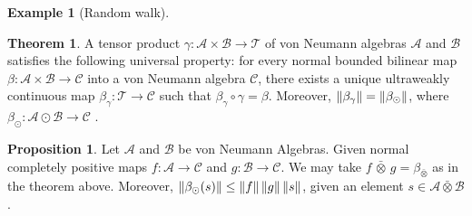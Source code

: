 \documentclass[10pt,a4paper]{amsart}
\theoremstyle{definition}
\theoremstyle{definition}
\newtheorem{example}[definition]{Example}
\theoremstyle{definition}
\newtheorem{lemma}[definition]{Lemma}
\theoremstyle{definition}
\newtheorem{proposition}[definition]{Proposition}
\theoremstyle{definition}
\theoremstyle{definition}
\newtheorem{theorem}[definition]{Theorem}
\begin{document}
\begin{example}[Random walk]
\begin{comment}
\begin{proposition} \cite[Proposition 3.2.2]{effrosOperatorSpaces2000} \label{prop:cb_dual}
  Given $C^*$-algebras $\mathcal{A}$ and $\mathcal{B}$, and a completely bounded mapping $\phi : A \to B$, we have
\[
\|\phi^*\|_{\text{cb}} =  \|\phi\|_{\text{cb}}.
\]
\end{proposition}



\begin{lemma} \cite[p.19]{pisierIntroductionOperatorSpace2003} \label{lem:cb_comp_submult}
  Given completely bounded maps $\phi: B (\mathcal{H}) \to B (\mathcal{K}) $ and $\psi: B (\mathcal{K}) \to B (\mathcal{L})$, it holds that
  $$ \cbnorm{\psi \cdot \phi} \leq \cbnorm{\psi} \cdot \cbnorm{\phi}  $$
\end{lemma}

\begin{proposition} \label{prop:dirsum_cb} \cite[Exercise 2.1.3.]{pisierIntroductionOperatorSpace2003}
  Let $\mathcal{H}_1, \mathcal{H}_2,  \mathcal{K} $ be Hilbert spaces.   Consider $\phi_i \in CB(B(\mathcal{K}), B(\mathcal{H}_i))$ ($i = 1,2$), and let $\phi \in 
  CB(B(\mathcal{K}), B(\mathcal{H}_1 \oplus  \mathcal{H}_2))$ be defined by $\phi(x) = (\phi_1(x),  \phi_2(x))$. It holds that 
  $$\cbnorm{\phi} = \max \{ \phi_1, \phi_2 \}.$$
\end{proposition}
\end{comment}

\begin{theorem} \cite[Theorem 112 XI]{westerbaanCategoryNeumannAlgebras2019} \label{thm:beta_alg_eq_beta_gamma}
A tensor product $\gamma\colon \mathcal{A} \times \mathcal{B} \to \mathcal{T}$ of von Neumann algebras $\mathcal{A}$ and $\mathcal{B}$ satisfies the following universal property: for every normal bounded bilinear map $\beta\colon  \mathcal{A} \times  \mathcal{B} \to \mathcal{C}$ into a von Neumann algebra $\mathcal{C}$, there exists a unique ultraweakly continuous map $\beta_\gamma\colon \mathcal{T} \to \mathcal{C}$ such that $\beta_\gamma \circ \gamma = \beta$. Moreover, $ \left\lVert \beta_\gamma \right\rVert = \left\lVert \beta_\odot \right\rVert$, where $
\beta_\odot\colon  \mathcal{A} \odot  \mathcal{B} \to \mathcal{C} 
$ .
\end{theorem}

\begin{proposition} \cite[Proof 115 III] {westerbaanCategoryNeumannAlgebras2019} \label{prop:norm_beta_alg}
  Let  $\mathcal{A}$ and $\mathcal{B}$ be von Neumann Algebras.
  Given normal completely positive maps $f:\mathcal{A} \to \mathcal{C}$ and $g:\mathcal{B} \to \mathcal{C}$. We may take $ f \, \bar{\otimes} \, g = \beta_{\bar{\otimes}}$ as in the theorem above. Moreover, $\left\lVert \beta_\odot(s) \right\rVert \leq \left\lVert f \right\rVert\left\lVert g \right\rVert\left\lVert s \right\rVert$, given an element $s\in \mathcal{A} \bar{\otimes} \mathcal{B}$.
\end{proposition}



\end{example}
\end{document}
